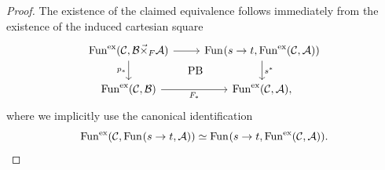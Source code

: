 \documentclass[10pt,a4paper]{amsart}
\newcommand{\category}[1]{\mathcal{#1}}
\newcommand{\A}{\category{A}}
\newcommand{\B}{\category{B}}
\newcommand{\C}{\category{C}}
\theoremstyle{plain}
\theoremstyle{definition}
\theoremstyle{remark}
\begin{document}
\begin{proof}
  The existence of the claimed equivalence follows immediately from the
  existence of the induced cartesian square
  \[
    \begin{tikzcd}
      \Fun<ex>{\C}{\B\vec{\times}_F\A}\rar\dar[swap]{p_*}\ar[phantom]{dr}[description]{\text{PB}}&\Fun{s\to t}{\Fun<ex>{\C}{\A}}\dar{s^*}\\
      \Fun<ex>{\C}{\B}\rar[swap]{F_*}&\Fun<ex>{\C}{\A},
    \end{tikzcd}
  \]
  where we implicitly use the canonical identification
  \[
    \Fun<ex>{\C}{\Fun{s\to t}{\A}}\simeq\Fun{s\to t}{\Fun<ex>{\C}{\A}}.\qedhere
  \]
\end{proof}
\end{document}
